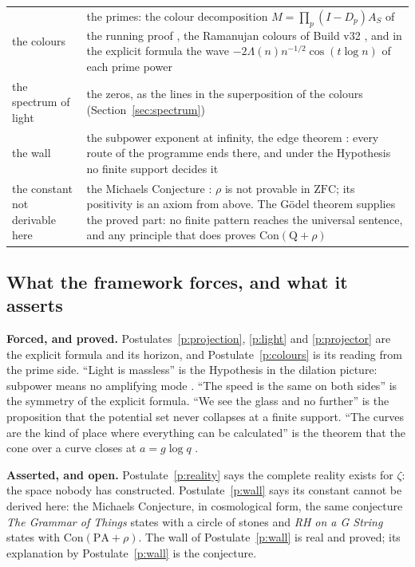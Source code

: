 \documentclass[11pt]{article}
\theoremstyle{definition}
\theoremstyle{remark}
\begin{document}
\begin{center}
\begin{tabular}{L{0.3\textwidth}L{0.64\textwidth}}
the colours & the primes: the colour decomposition $M=\prod_p(I-D_p)A_S$ of the running proof \cite{running}, the Ramanujan colours of Build v32 \cite{v32}, and in the explicit formula the wave $-2\Lambda(n)n^{-1/2}\cos(t\log n)$ of each prime power\\
the spectrum of light & the zeros, as the lines in the superposition of the colours (Section~\ref{sec:spectrum})\\
the wall & the subpower exponent at infinity, the edge theorem \cite[Thm.\ 2.10]{horizon}: every route of the programme ends there, and under the Hypothesis no finite support decides it \cite[Prop.\ 2.11]{horizon}\\
the constant not derivable here & the Michaels Conjecture \cite[\S10]{gstring}: $\rho$ is not provable in $\mathrm{ZFC}$; its positivity is an axiom from above. The Gödel theorem supplies the proved part: no finite pattern reaches the universal sentence, and any principle that does proves $\mathrm{Con}(\mathrm Q+\rho)$\\
\bottomrule
\end{tabular}
\end{center}

\subsection{What the framework forces, and what it asserts}
\textbf{Forced, and proved.} Postulates~\ref{p:projection}, \ref{p:light} and \ref{p:projector} are the explicit formula and its horizon, and Postulate~\ref{p:colours} is its reading from the prime side. ``Light is massless'' is the Hypothesis in the dilation picture: subpower means no amplifying mode \cite[Crossing 3]{arith}. ``The speed is the same on both sides'' is the symmetry of the explicit formula. ``We see the glass and no further'' is the proposition that the potential set never collapses at a finite support. ``The curves are the kind of place where everything can be calculated'' is the theorem that the cone over a curve closes at $a=g\log q$ \cite{ffcone}.

\textbf{Asserted, and open.} Postulate~\ref{p:reality} says the complete reality exists for $\zeta$: the space nobody has constructed. Postulate~\ref{p:wall} says its constant cannot be derived here: the Michaels Conjecture, in cosmological form, the same conjecture \emph{The Grammar of Things} states with a circle of stones and \emph{RH on a G String} states with $\mathrm{Con}(\mathrm{PA}+\rho)$. The wall of Postulate~\ref{p:wall} is real and proved; its explanation by Postulate~\ref{p:wall} is the conjecture.
\end{document}
